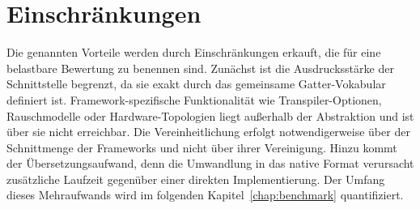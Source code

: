\newpage

\section{Einschränkungen}
\label{sec:vorteile_grenzen}

Die genannten Vorteile werden durch Einschränkungen erkauft, die für eine
belastbare Bewertung zu benennen sind. Zunächst ist die Ausdrucksstärke der
Schnittstelle begrenzt, da sie exakt durch das gemeinsame Gatter-Vokabular
definiert ist. Framework-spezifische Funktionalität wie Transpiler-Optionen,
Rauschmodelle oder Hardware-Topologien liegt außerhalb der Abstraktion und ist
über sie nicht erreichbar. Die Vereinheitlichung erfolgt notwendigerweise über
der Schnittmenge der Frameworks und nicht über ihrer Vereinigung. Hinzu kommt der
Übersetzungsaufwand, denn die Umwandlung in das native Format verursacht
zusätzliche Laufzeit gegenüber einer direkten Implementierung. Der Umfang dieses
Mehraufwands wird im folgenden Kapitel~\ref{chap:benchmark} quantifiziert.
